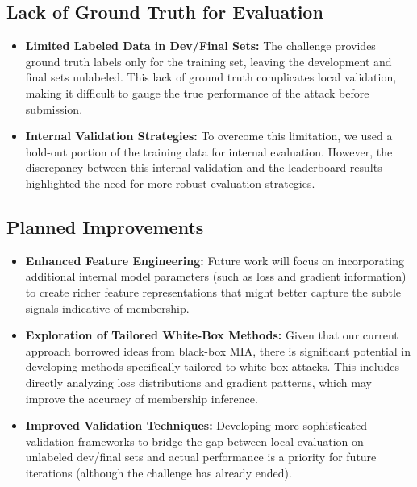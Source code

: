 \documentclass[12pt]{article}
\begin{document}
\subsection{Lack of Ground Truth for Evaluation}
\begin{itemize}
    \item \textbf{Limited Labeled Data in Dev/Final Sets:}  
    The challenge provides ground truth labels only for the training set, leaving the development and final sets unlabeled. This lack of ground truth complicates local validation, making it difficult to gauge the true performance of the attack before submission.
    
    \item \textbf{Internal Validation Strategies:}  
    To overcome this limitation, we used a hold-out portion of the training data for internal evaluation. However, the discrepancy between this internal validation and the leaderboard results highlighted the need for more robust evaluation strategies.
\end{itemize}

\subsection{Planned Improvements}
\begin{itemize}
    \item \textbf{Enhanced Feature Engineering:}  
    Future work will focus on incorporating additional internal model parameters (such as loss and gradient information) to create richer feature representations that might better capture the subtle signals indicative of membership.
    
    \item \textbf{Exploration of Tailored White-Box Methods:}  
    Given that our current approach borrowed ideas from black-box MIA, there is significant potential in developing methods specifically tailored to white-box attacks. This includes directly analyzing loss distributions and gradient patterns, which may improve the accuracy of membership inference.
    
    \item \textbf{Improved Validation Techniques:}  
    Developing more sophisticated validation frameworks to bridge the gap between local evaluation on unlabeled dev/final sets and actual performance is a priority for future iterations (although the challenge has already ended).

\end{itemize}
\end{document}

